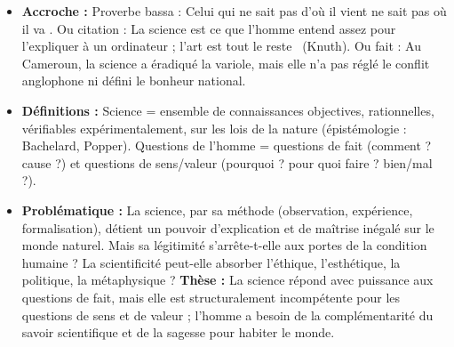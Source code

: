 \documentclass[11pt]{article}
\newcommand{\cle}[1]{{\popxbold\color{popdark}#1}}
\newcounter{popsec}
\newcounter{popsub}
\newcommand{\courssub}[1]{%
  \stepcounter{popsub}%
  \par\vspace{9pt}\noindent{\popxbold\fontsize{11.5}{13}\selectfont\color{popink}{\color{poporange}\thepopsec.\thepopsub}\hspace{6pt}#1}\par\nopagebreak\vspace{4pt}
}
\begin{document}
\begin{corrige}
\courssub{Introduction}
\begin{itemize}
\item \textbf{Accroche :} Proverbe bassa : \guillemotleft Celui qui ne sait pas d'où il vient ne sait pas où il va \guillemotright. Ou citation : \guillemotleft La science est ce que l'homme entend assez pour l'expliquer à un ordinateur ; l'art est tout le reste \guillemotright\ (Knuth). Ou fait : Au Cameroun, la science a éradiqué la variole, mais elle n'a pas réglé le conflit anglophone ni défini le bonheur national.
\item \textbf{Définitions :} Science = ensemble de connaissances objectives, rationnelles, vérifiables expérimentalement, sur les lois de la nature (épistémologie : Bachelard, Popper). Questions de l'homme = questions de \cle{fait} (comment ? cause ?) et questions de \cle{sens/valeur} (pourquoi ? pour quoi faire ? bien/mal ?).
\item \textbf{Problématique :} La science, par sa méthode (observation, expérience, formalisation), détient un pouvoir d'explication et de maîtrise inégalé sur le monde naturel. Mais sa légitimité s'arrête-t-elle aux portes de la condition humaine ? La scientificité peut-elle absorber l'éthique, l'esthétique, la politique, la métaphysique ? \textbf{Thèse :} La science répond avec puissance aux questions de \cle{fait}, mais elle est \cle{structuralement incompétente} pour les questions de \cle{sens} et de \cle{valeur} ; l'homme a besoin de la \cle{complémentarité} du savoir scientifique et de la \cle{sagesse} pour habiter le monde.
\end{itemize}


\end{corrige}
\end{document}
